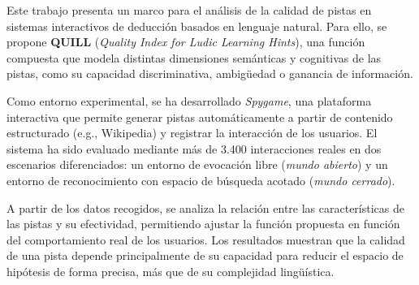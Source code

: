 \documentclass[../main.tex]{subfiles}
\begin{document}
Este trabajo presenta un marco para el análisis de la calidad de pistas en sistemas interactivos de deducción basados en lenguaje natural. Para ello, se propone \textbf{QUILL} (\textit{Quality Index for Ludic Learning Hints}), una función compuesta que modela distintas dimensiones semánticas y cognitivas de las pistas, como su capacidad discriminativa, ambigüedad o ganancia de información.

Como entorno experimental, se ha desarrollado \textit{Spygame}, una plataforma interactiva que permite generar pistas automáticamente a partir de contenido estructurado (e.g., Wikipedia) y registrar la interacción de los usuarios. El sistema ha sido evaluado mediante más de 3.400 interacciones reales en dos escenarios diferenciados: un entorno de evocación libre (\textit{mundo abierto}) y un entorno de reconocimiento con espacio de búsqueda acotado (\textit{mundo cerrado}).

A partir de los datos recogidos, se analiza la relación entre las características de las pistas y su efectividad, permitiendo ajustar la función propuesta en función del comportamiento real de los usuarios. Los resultados muestran que la calidad de una pista depende principalmente de su capacidad para reducir el espacio de hipótesis de forma precisa, más que de su complejidad lingüística.
\end{document}
